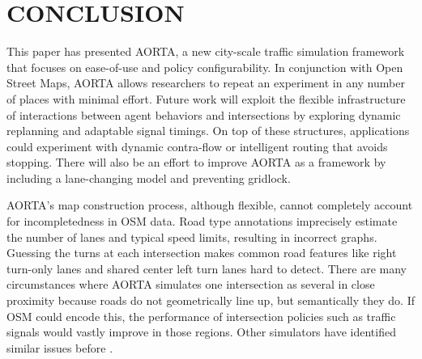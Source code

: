 \documentclass[letterpaper, 10 pt, conference]{ieeeconf}  %
\begin{document}

\section{CONCLUSION}
\label{sec:conclusion}

This paper has presented AORTA, a new city-scale traffic simulation framework
that focuses on ease-of-use and policy configurability. In conjunction with Open
Street Maps, AORTA allows researchers to repeat an experiment in any number of
places with minimal effort. Future work will exploit the flexible infrastructure
of interactions between agent behaviors and intersections by exploring dynamic
replanning and adaptable signal timings. On top of these structures,
applications could experiment with dynamic contra-flow \cite{ITSC11-hausknecht}
or intelligent routing that avoids stopping. There will also be an effort to
improve AORTA as a framework by including a lane-changing model and preventing
gridlock. 

AORTA's map construction process, although flexible, cannot completely account
for incompletedness in OSM data.  Road type annotations imprecisely estimate
the number of lanes and typical speed limits, resulting in incorrect graphs.
Guessing the turns at each intersection makes common road features like right
turn-only lanes and shared center left turn lanes hard to detect. There are
many circumstances where AORTA simulates one intersection as several in close
proximity because roads do not geometrically line up, but semantically they do.
If OSM could encode this, the performance of intersection policies such as
traffic signals would vastly improve in those regions. Other simulators have
identified similar issues before \cite{Krajzewicz_Hertkorn_Ringel_Wagner_2005}.


\addtolength{\textheight}{-12cm}  %
\end{document}
